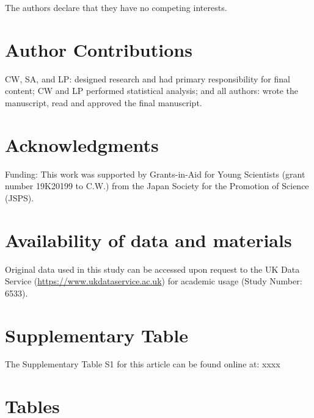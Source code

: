 \documentclass[utf8]{frontiersSCNS}
\begin{document}
The authors declare that they have no competing interests.

\hypertarget{author-contributions}{%
\section*{Author Contributions}\label{author-contributions}}

CW, SA, and LP: designed research and had primary responsibility for
final content; CW and LP performed statistical analysis; and all
authors: wrote the manuscript, read and approved the final manuscript.

\hypertarget{acknowledgments}{%
\section*{Acknowledgments}\label{acknowledgments}}

Funding: This work was supported by Grants-in-Aid for Young Scientists
(grant number 19K20199 to C.W.) from the Japan Society for the Promotion
of Science (JSPS).

\hypertarget{availability-of-data-and-materials}{%
\section*{Availability of data and
materials}\label{availability-of-data-and-materials}}

Original data used in this study can be accessed upon request to the UK
Data Service (\url{https://www.ukdataservice.ac.uk}) for academic usage
(Study Number: 6533).

\hypertarget{supplementary-table}{%
\section*{Supplementary Table}\label{supplementary-table}}

The Supplementary Table S1 for this article can be found online at: xxxx

\newpage

\hypertarget{tables}{%
\section*{Tables}\label{tables}}
\end{document}
